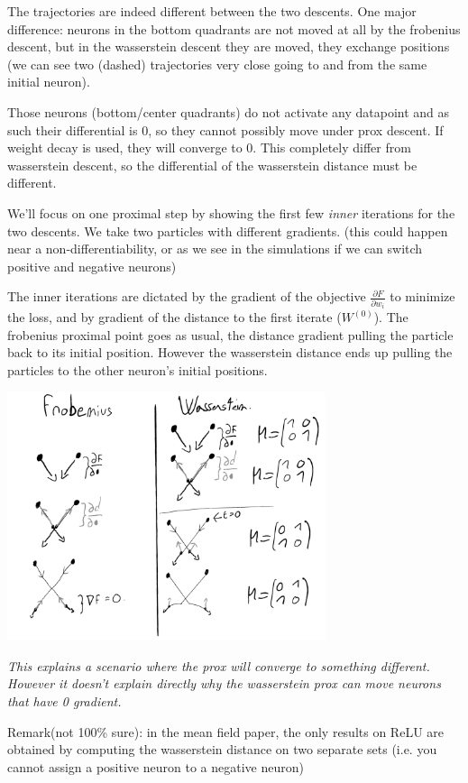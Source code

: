 The trajectories are indeed different between the two descents. One major difference: neurons in the bottom quadrants are not moved at all by the frobenius descent, but in the wasserstein descent they are moved, they exchange positions (we can see two (dashed) trajectories very close going to and from the same initial neuron).

Those neurons (bottom/center quadrants) do not activate any datapoint and as such their differential is 0, so they cannot possibly move under prox descent. If weight decay is used, they will converge to 0. This completely differ from wasserstein descent, so the differential of the wasserstein distance must be different.

We'll focus on one proximal step by showing the first few \emph{inner} iterations for the two descents. We take two particles with different gradients. (this could happen near a non-differentiability, or as we see in the simulations if we can switch positive and negative neurons)

The inner iterations are dictated by the gradient of the objective $\frac{\partial F}{\partial w_i}$ to minimize the loss, and by gradient of the distance to the first iterate ($W^{(0)}$). The frobenius proximal point goes as usual, the distance gradient pulling the particle back to its initial position. However the wasserstein distance ends up pulling the particles to the other neuron's initial positions.

\includegraphics[width=0.7\textwidth]{imgs/schema_one_prox_step.png}

\emph{This explains a scenario where the prox will converge to something different. However it doesn't explain directly why the wasserstein prox can move neurons that have 0 gradient.}

Remark(not 100\% sure): in the mean field paper, the only results on ReLU are obtained by computing the wasserstein distance on two separate sets (i.e. you cannot assign a positive neuron to a negative neuron)


